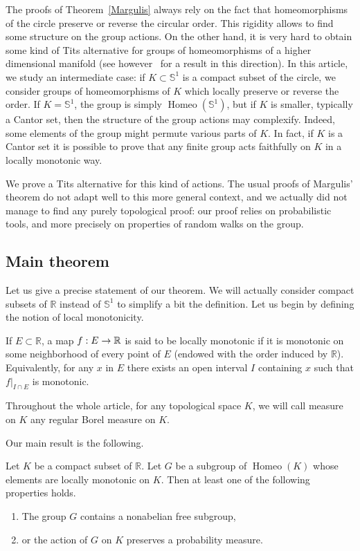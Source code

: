 \documentclass[AHL,Unicode,longabstracts,published]{cedram}
\DeclareMathOperator{\Homeo}{Homeo}
\newcommand{\bbS}{\mathbb{S}}
\newcommand{\R}{\mathbb{R}}
\newcounter{setofcase}
\newcounter{case}[setofcase]
\renewcommand*{\to}{\mathchoice{\longrightarrow}{\rightarrow}{\rightarrow}{\rightarrow}}
\newcommand{\R}{\mathbb{R}}
\begin{document}
The proofs of Theorem~\ref{Margulis} always rely on the fact that homeomorphisms of the circle preserve or reverse the circular order. This rigidity allows to find some structure on the group actions. On the other hand, it is very hard to obtain some kind of Tits alternative for groups of homeomorphisms of a higher dimensional manifold (see however~\cite{HX} for a result in this direction). In this article, we study an intermediate case: if $K\subset \bbS^1$ is a compact subset of the circle, we consider groups of homeomorphisms of $K$ which locally preserve or reverse the order. If $K= \bbS^1$, the group is simply $\Homeo(\bbS^1)$, but if $K$ is smaller, typically a Cantor set, then the structure of the group actions may complexify. Indeed, some elements of the group might permute various parts of $K$. In fact, if $K$ is a Cantor set it is possible to prove that any finite group acts faithfully on $K$ in a locally monotonic way.

We prove a Tits alternative for this kind of actions. The usual proofs of Margulis' theorem do not adapt well to this more general context, and we actually did not manage to find any purely topological proof: our proof relies on probabilistic tools, and more precisely on properties of random walks on the group.

\subsection{Main theorem}

Let us give a precise statement of our theorem. We will actually consider compact subsets of $\R$ instead of $\bbS^1$ to simplify a bit the definition. Let us begin by defining the notion of local monotonicity.

\begin{defi}\label{locmon}
If $E\subset \R$, a map $f:E\to \R$ is said to be locally monotonic if it is monotonic on some neighborhood of every point of $E$ (endowed with the order induced by $\R$). Equivalently, for any $x$ in $E$ there exists an open interval $I$ containing $x$ such that $f|_{I\cap E}$ is monotonic.
\end{defi}

Throughout the whole article, for any topological space $K$, we will call measure on $K$ any regular Borel measure on $K$.

Our main result is the following.

\begin{theo}\label{Tits}
Let $K$ be a compact subset of $\R$. Let $G$ be a subgroup of $\Homeo(K)$ whose elements are locally monotonic on $K$. Then at least one of the following properties holds.
\begin{enumerate}
\item\label{theo1.3.1} The group $G$ contains a nonabelian free subgroup,
\item\label{theo1.3.2} or the action of $G$ on $K$ preserves a probability measure.
\end{enumerate}
\end{theo}
\end{document}
